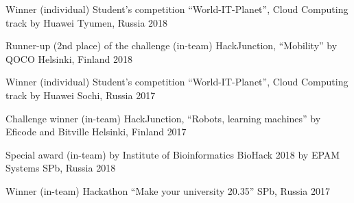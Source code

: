 



\begin{cvhonors}

	\cvhonor
		{Winner (individual)} %
		{Student's competition \enquote{World-IT-Planet}, Cloud Computing track by Huawei} %
		{Tyumen, Russia} %
		{2018} %
		
	\cvhonor
		{Runner-up (2nd place) of the challenge (in-team)} %
		{HackJunction, \enquote{Mobility} by QOCO} %
		{Helsinki, Finland} %
		{2018} %
		

	\cvhonor
		{Winner (individual)} %
		{Student's competition \enquote{World-IT-Planet}, Cloud Computing track by Huawei} %
		{Sochi, Russia} %
		{2017} %
		
	\cvhonor
		{Challenge winner (in-team)} %
		{HackJunction, \enquote{Robots, learning machines} by Eficode and Bitville} %
		{Helsinki, Finland} %
		{2017} %

\end{cvhonors}




\begin{cvhonors}

	\cvhonor
		{Special award (in-team) by Institute of Bioinformatics} %
		{BioHack 2018 by EPAM Systems} %
		{SPb, Russia} %
		{2018} %

	\cvhonor
		{Winner (in-team)} %
		{Hackathon \enquote{Make your university 20.35}} %
		{SPb, Russia} %
		{2017} %


\end{cvhonors}
